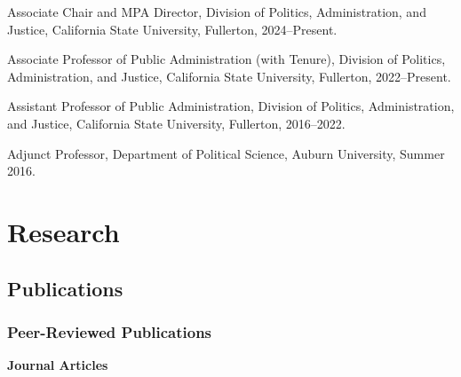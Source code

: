 \documentclass[12pt,letterpaper]{article}
\renewenvironment{itemize}{
  \begin{list}{}{
    \setlength{\leftmargin}{1.5em}
    \setlength{\itemsep}{0.25em}
    \setlength{\parskip}{0pt}
    \setlength{\parsep}{0.25em}
  }
}{
  \end{list}
}
\begin{document}
  \begin{itemize}\leftmargin=2pt\itemindent=-15pt\leftmargin=2pt\itemindent=-15pt
      \item Associate Chair and MPA Director, Division of Politics, Administration, and Justice, California State University, Fullerton, 2024--Present. \vspace{0.2cm}
      \item Associate Professor of Public Administration (with Tenure), Division of Politics, Administration, and Justice, California State University, Fullerton, 2022--Present. \vspace{0.2cm}
      \item Assistant Professor of Public Administration, Division of Politics, Administration, and Justice, California State University, Fullerton,  2016--2022.\vspace{0.2cm}
      \item Adjunct Professor, Department of Political Science, Auburn University, Summer 2016.
  \end{itemize}

\section*{Research}

\subsection*{Publications}

\subsubsection*{Peer-Reviewed Publications}

\textbf{Journal Articles}
\end{document}

